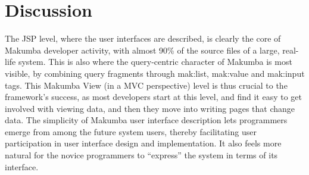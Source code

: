 \documentclass{chi2009}
\begin{document}
%

\section{Discussion}\label{sec:disco}
The JSP level, where the user interfaces are described, is clearly the core of Makumba developer activity, with almost 90\% of the source files of a large, real-life system. This is also where the query-centric character of Makumba is most visible, by combining query fragments through mak:list, mak:value and mak:input tags. This Makumba View (in a MVC perspective) level is thus crucial to the framework's success, as most developers start at this level, and find it easy to get involved with viewing data, and then they move into writing pages that change data. The simplicity of Makumba user interface description lets programmers emerge from among the future system users, thereby facilitating user participation in user interface design and implementation. It also feels more natural for the novice programmers to ``express'' the system in terms of its interface.

\end{document}
